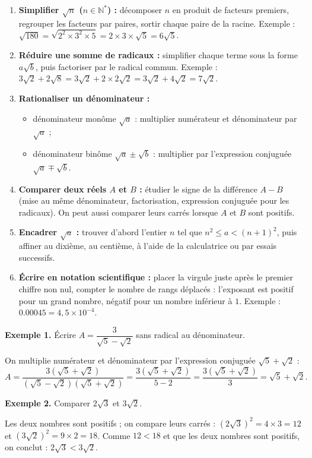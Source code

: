 \documentclass[11pt]{article}
\newcounter{popsec}
\newcounter{popsub}
\newcommand{\courssub}[1]{%
  \stepcounter{popsub}%
  \par\vspace{9pt}\noindent{\popxbold\fontsize{11.5}{13}\selectfont\color{popink}{\color{poporange}\thepopsec.\thepopsub}\hspace{6pt}#1}\par\nopagebreak\vspace{4pt}
}
\begin{document}
\courssub{Méthodes express}
\begin{methode}
\begin{enumerate}
    \item \textbf{Simplifier $\sqrt{n}$ ($n \in \mathbb{N}^*$) :} décomposer $n$ en produit de facteurs premiers, regrouper les facteurs par paires, sortir chaque paire de la racine. Exemple : $\sqrt{180} = \sqrt{2^2 \times 3^2 \times 5} = 2 \times 3 \times \sqrt{5} = 6\sqrt{5}$.
    \item \textbf{Réduire une somme de radicaux :} simplifier chaque terme sous la forme $a\sqrt{b}$, puis factoriser par le radical commun. Exemple : $3\sqrt{2} + 2\sqrt{8} = 3\sqrt{2} + 2 \times 2\sqrt{2} = 3\sqrt{2} + 4\sqrt{2} = 7\sqrt{2}$.
    \item \textbf{Rationaliser un dénominateur :}
    \begin{itemize}
        \item dénominateur monôme $\sqrt{a}$ : multiplier numérateur et dénominateur par $\sqrt{a}$ ;
        \item dénominateur binôme $\sqrt{a} \pm \sqrt{b}$ : multiplier par l'expression conjuguée $\sqrt{a} \mp \sqrt{b}$.
    \end{itemize}
    \item \textbf{Comparer deux réels $A$ et $B$ :} étudier le signe de la différence $A - B$ (mise au même dénominateur, factorisation, expression conjuguée pour les radicaux). On peut aussi comparer leurs carrés lorsque $A$ et $B$ sont positifs.
    \item \textbf{Encadrer $\sqrt{a}$ :} trouver d'abord l'entier $n$ tel que $n^2 \le a < (n+1)^2$, puis affiner au dixième, au centième, à l'aide de la calculatrice ou par essais successifs.
    \item \textbf{Écrire en notation scientifique :} placer la virgule juste après le premier chiffre non nul, compter le nombre de rangs déplacés : l'exposant est positif pour un grand nombre, négatif pour un nombre inférieur à $1$. Exemple : $\num{0,00045} = 4,5 \times 10^{-4}$.
\end{enumerate}
\end{methode}

\begin{exemplebox}
\textbf{Exemple 1.} Écrire $A = \dfrac{3}{\sqrt{5} - \sqrt{2}}$ sans radical au dénominateur.

On multiplie numérateur et dénominateur par l'expression conjuguée $\sqrt{5} + \sqrt{2}$ :
\[ A = \dfrac{3(\sqrt{5} + \sqrt{2})}{(\sqrt{5} - \sqrt{2})(\sqrt{5} + \sqrt{2})} = \dfrac{3(\sqrt{5} + \sqrt{2})}{5 - 2} = \dfrac{3(\sqrt{5} + \sqrt{2})}{3} = \sqrt{5} + \sqrt{2}. \]

\textbf{Exemple 2.} Comparer $2\sqrt{3}$ et $3\sqrt{2}$.

Les deux nombres sont positifs ; on compare leurs carrés :
$(2\sqrt{3})^2 = 4 \times 3 = 12$ et $(3\sqrt{2})^2 = 9 \times 2 = 18$.
Comme $12 < 18$ et que les deux nombres sont positifs, on conclut : $2\sqrt{3} < 3\sqrt{2}$.
\end{exemplebox}
\end{document}
